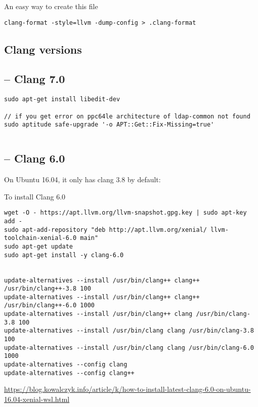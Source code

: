 An easy way to create this file
\begin{verbatim}
clang-format -style=llvm -dump-config > .clang-format
\end{verbatim}


\subsection{Clang versions}

\subsection{-- Clang 7.0}
\label{sec:clang-7.0}

\begin{verbatim}
sudo apt-get install libedit-dev

// if you get error on ppc64le architecture of ldap-common not found
sudo aptitude safe-upgrade '-o APT::Get::Fix-Missing=true'
\end{verbatim}



\begin{verbatim}

\end{verbatim}

\subsection{-- Clang 6.0}
\label{sec:clang-6.0}

On Ubuntu 16.04, it only has clang 3.8 by default: 

To install Clang 6.0
\begin{verbatim}
wget -O - https://apt.llvm.org/llvm-snapshot.gpg.key | sudo apt-key add -
sudo apt-add-repository "deb http://apt.llvm.org/xenial/ llvm-toolchain-xenial-6.0 main"
sudo apt-get update
sudo apt-get install -y clang-6.0


update-alternatives --install /usr/bin/clang++ clang++ /usr/bin/clang++-3.8 100
update-alternatives --install /usr/bin/clang++ clang++ /usr/bin/clang++-6.0 1000
update-alternatives --install /usr/bin/clang++ clang /usr/bin/clang-3.8 100
update-alternatives --install /usr/bin/clang clang /usr/bin/clang-3.8 100
update-alternatives --install /usr/bin/clang clang /usr/bin/clang-6.0 1000
update-alternatives --config clang
update-alternatives --config clang++
\end{verbatim}
\url{https://blog.kowalczyk.info/article/k/how-to-install-latest-clang-6.0-on-ubuntu-16.04-xenial-wsl.html}

